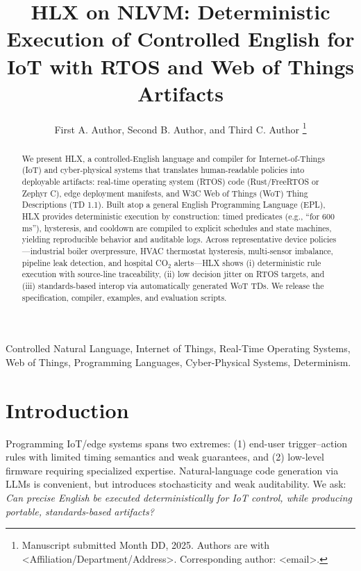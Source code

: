 \documentclass[journal]{IEEEtran}
\begin{document}
\title{HLX on NLVM: Deterministic Execution of Controlled English for IoT with RTOS and Web of Things Artifacts}

\author{First A. Author, Second B. Author, and Third C. Author%
\thanks{Manuscript submitted Month DD, 2025. Authors are with <Affiliation/Department/Address>. Corresponding author: <email>.}}

\maketitle

\begin{abstract}
We present HLX, a controlled-English language and compiler for Internet-of-Things (IoT) and cyber-physical systems that translates human-readable policies into deployable artifacts: real-time operating system (RTOS) code (Rust/FreeRTOS or Zephyr C), edge deployment manifests, and W3C Web of Things (WoT) Thing Descriptions (TD 1.1). Built atop a general English Programming Language (EPL), HLX provides deterministic execution by construction: timed predicates (e.g., “for 600\,ms”), hysteresis, and cooldown are compiled to explicit schedules and state machines, yielding reproducible behavior and auditable logs. Across representative device policies—industrial boiler overpressure, HVAC thermostat hysteresis, multi-sensor imbalance, pipeline leak detection, and hospital CO$_2$ alerts—HLX shows (i) deterministic rule execution with source-line traceability, (ii) low decision jitter on RTOS targets, and (iii) standards-based interop via automatically generated WoT TDs. We release the specification, compiler, examples, and evaluation scripts.
\end{abstract}

\begin{IEEEkeywords}
Controlled Natural Language, Internet of Things, Real-Time Operating Systems, Web of Things, Programming Languages, Cyber-Physical Systems, Determinism.
\end{IEEEkeywords}

\section{Introduction}
Programming IoT/edge systems spans two extremes: (1) end-user trigger–action rules with limited timing semantics and weak guarantees, and (2) low-level firmware requiring specialized expertise. Natural-language code generation via LLMs is convenient, but introduces stochasticity and weak auditability. We ask: \emph{Can precise English be executed deterministically for IoT control, while producing portable, standards-based artifacts?}
\end{document}
